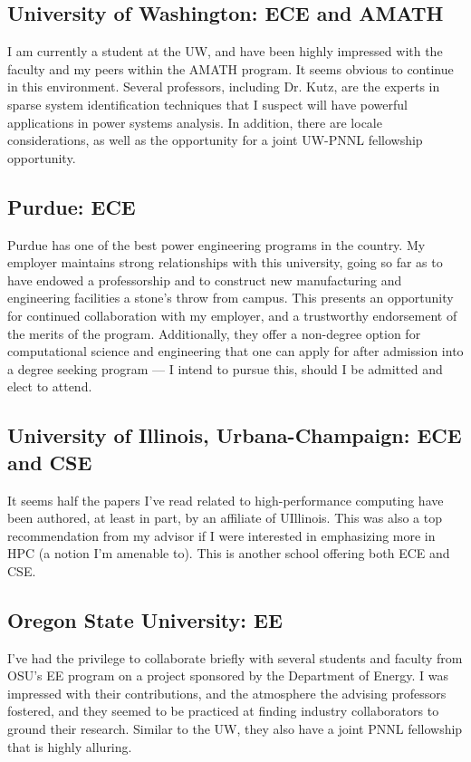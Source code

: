 \documentclass[letterpaper]{article}
\begin{document}
\subsection*{University of Washington: ECE and AMATH}
I am currently a student at the UW, and have been highly impressed with the faculty and my
peers within the AMATH program. It seems obvious to continue in this environment. Several
professors, including Dr. Kutz, are the experts in sparse system identification techniques
that I suspect will have powerful applications in power systems analysis. In addition,
there are locale considerations, as well as the opportunity for a joint UW-PNNL fellowship
opportunity.

\subsection*{Purdue: ECE}
Purdue has one of the best power engineering programs in the country. My employer maintains
strong relationships with this university, going so far as to have endowed a professorship
and to construct new manufacturing and engineering facilities a stone's throw from campus.
This presents an opportunity for continued collaboration with my employer, and a trustworthy
endorsement of the merits of the program. Additionally, they offer a non-degree option
for computational science and engineering that one can apply for after admission into a
degree seeking program --- I intend to pursue this, should I be admitted and elect to attend.

\subsection*{University of Illinois, Urbana-Champaign: ECE and CSE}
It seems half the papers I've read related to high-performance computing have been
authored, at least in part, by an affiliate of UIllinois. This was also a top
recommendation from my advisor if I were interested in emphasizing more in HPC
(a notion I'm amenable to). This is another school offering both ECE and CSE.

\subsection*{Oregon State University: EE}
I've had the privilege to collaborate briefly with several students and faculty from OSU's
EE program on a project sponsored by the Department of Energy. I was impressed with their
contributions, and the atmosphere the advising professors fostered, and they seemed to
be practiced at finding industry collaborators to ground their research. Similar to the UW,
they also have a joint PNNL fellowship that is highly alluring.
\end{document}
